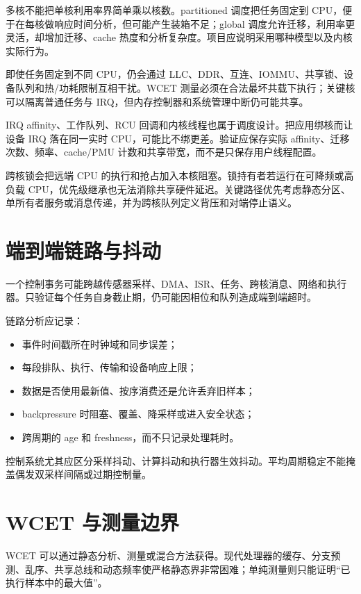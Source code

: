 多核不能把单核利用率界简单乘以核数。partitioned 调度把任务固定到 CPU，便于在每核做响应时间分析，但可能产生装箱不足；global 调度允许迁移，利用率更灵活，却增加迁移、cache 热度和分析复杂度。项目应说明采用哪种模型以及内核实际行为。

即使任务固定到不同 CPU，仍会通过 LLC、DDR、互连、IOMMU、共享锁、设备队列和热/功耗限制互相干扰。WCET 测量必须在合法最坏共载下执行；关键核可以隔离普通任务与 IRQ，但内存控制器和系统管理中断仍可能共享。

IRQ affinity、工作队列、RCU 回调和内核线程也属于调度设计。把应用绑核而让设备 IRQ 落在同一实时 CPU，可能比不绑更差。验证应保存实际 affinity、迁移次数、频率、cache/PMU 计数和共享带宽，而不是只保存用户线程配置。

跨核锁会把远端 CPU 的执行和抢占加入本核阻塞。锁持有者若运行在可降频或高负载 CPU，优先级继承也无法消除共享硬件延迟。关键路径优先考虑静态分区、单所有者服务或消息传递，并为跨核队列定义背压和对端停止语义。

\section{端到端链路与抖动}

一个控制事务可能跨越传感器采样、DMA、ISR、任务、跨核消息、网络和执行器。只验证每个任务自身截止期，仍可能因相位和队列造成端到端超时。

链路分析应记录：
\begin{itemize}
  \item 事件时间戳所在时钟域和同步误差；
  \item 每段排队、执行、传输和设备响应上限；
  \item 数据是否使用最新值、按序消费还是允许丢弃旧样本；
  \item backpressure 时阻塞、覆盖、降采样或进入安全状态；
  \item 跨周期的 age 和 freshness，而不只记录处理耗时。
\end{itemize}

控制系统尤其应区分采样抖动、计算抖动和执行器生效抖动。平均周期稳定不能掩盖偶发双采样间隔或过期控制量。

\section{WCET 与测量边界}

WCET 可以通过静态分析、测量或混合方法获得。现代处理器的缓存、分支预测、乱序、共享总线和动态频率使严格静态界非常困难；单纯测量则只能证明“已执行样本中的最大值”。

